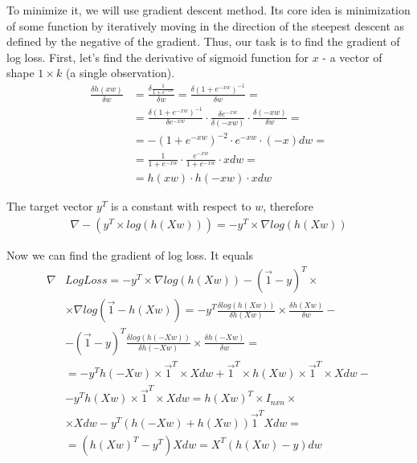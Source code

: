 \documentclass[a4paper, 12pt]{extreport}
\begin{document}
To minimize it, we will use gradient descent method. Its core idea is minimization of some function by iteratively moving in the direction of the steepest descent as defined by the negative of the gradient.
Thus, our task is to find the gradient of log loss. First, let's find the derivative of sigmoid function for $x$ - a vector of shape $1 \times k$ (a single observation).
\begin{align}
	\frac{\delta h(xw)}{\delta w} &= \frac{\delta \frac{1}{1 + e^{-xw}}}{\delta w} = \frac{\delta (1 + e^{-xw})^{-1}}{\delta w} = \nonumber \\ %
	&= \frac{\delta (1 + e^{-xw})^{-1}}{\delta e^{-xw}} \cdot \frac{\delta e^{-xw}}{\delta (-xw)} \cdot \frac{\delta (-xw)}{\delta w}  = \nonumber \\
	&= - (1 + e^{-xw})^{-2} \cdot e^{-xw} \cdot (-x) dw = \nonumber \\
	&= \frac{1}{1 + e^{-xw}} \cdot \frac{e^{-xw}}{1 + e^{-xw}} \cdot xdw = \nonumber \\
	&=  h(xw) \cdot h(-xw) \cdot x dw
\end{align}

The target vector $y^T$ is a constant with respect to $w$, therefore
\begin{align}
	\nabla - (y^T \times log(h(Xw))) = -y^T \times \nabla log(h(Xw))
\end{align}

Now we can find the gradient of log loss. It equals
\begin{align}
	\nabla &LogLoss = -y^T \times \nabla log(h(Xw)) - (\vec 1 - y)^T \times \nonumber \\
	 &\times \nabla log(\vec 1 - h(Xw)) = -y^T \frac{\delta log(h(Xw))}{\delta h(Xw)} \times \frac{\delta h(Xw)}{\delta w} - \nonumber \\
	 &- (\vec 1 - y)^T \frac{\delta log(h(-Xw))}{\delta h(-Xw)} \times \frac{\delta h(-Xw)}{\delta w} = \nonumber \\
	 &= -y^T h(-Xw) \times \vec 1^T \times Xdw + \vec 1^T \times h(Xw) \times \vec 1^T \times Xdw - \nonumber \\
	 &- y^T h(Xw) \times \vec 1^T \times Xdw = h(Xw)^T \times I_{nxn} \times \nonumber \\
	 &\times Xdw - y^T(h(-Xw) + h(Xw)) \vec 1^T Xdw = \nonumber \\
	 &= (h(Xw)^T - y^T) Xdw = X^T(h(Xw) - y)dw
\end{align}
\end{document}
